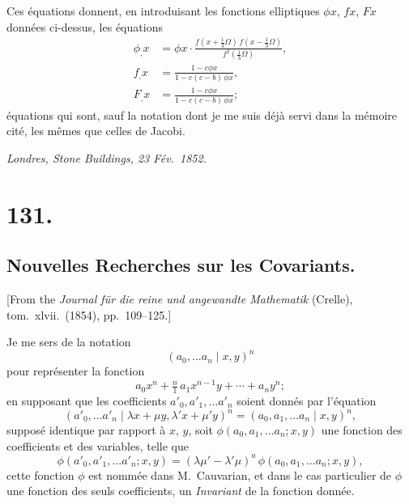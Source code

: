 \documentclass[11pt,a4paper]{article}
\begin{document}
Ces \'equations donnent, en introduisant les fonctions elliptiques $\phi x$, $fx$, $Fx$ donn\'ees ci-dessus, les \'equations
\begin{align*}
\phi_{,} x &= \phi x\cdot\frac{f(x + \tfrac{1}{3}\Omega)\,f(x - \tfrac{1}{3}\Omega)}{f^2(\tfrac{1}{3}\Omega)},\\
f_{,} x &= \frac{1 - c\phi x}{1 - c(c - b)\,\phi x},\\
F_{,} x &= \frac{1 - c\phi x}{1 - c(c - b)\,\phi x};
\end{align*}
\'equations qui sont, sauf la notation dont je me suis d\'ej\`a servi dans la m\'emoire cit\'e, les m\^emes que celles de Jacobi.

\medskip
\noindent\textit{Londres, Stone Buildings, 23 F\'ev.\ 1852.}


\section*{131.}
\subsection*{Nouvelles Recherches sur les Covariants.}


[From the \textit{Journal f\"ur die reine und angewandte Mathematik} (Crelle), tom.\ xlvii.\ (1854), pp.\ 109--125.]

\medskip

Je me sers de la notation
\[
(a_0, \ldots a_n \mid x, y)^n
\]
pour repr\'esenter la fonction
\[
a_0 x^n + \tfrac{n}{1}\, a_1 x^{n-1} y + \cdots + a_n y^n;
\]
en supposant que les coefficients $a'_0, a'_1, \ldots a'_n$ soient donn\'es par l'\'equation
\[
(a'_0, \ldots a'_n \mid \lambda x + \mu y, \lambda' x + \mu' y)^n = (a_0, a_1, \ldots a_n \mid x, y)^n,
\]
suppos\'e identique par rapport \`a $x$, $y$, soit $\phi(a_0, a_1, \ldots a_n; x, y)$ une fonction des coefficients et des variables, telle que
\[
\phi(a'_0, a'_1, \ldots a'_n; x, y) = (\lambda\mu' - \lambda'\mu)^a\,\phi(a_0, a_1, \ldots a_n; x, y),
\]
cette fonction $\phi$ est nomm\'ee dans M.\ Cauvarian, et dans le cas particulier de $\phi$ une fonction des seuls coefficients, un \emph{Invariant} de la fonction donn\'ee.

\medskip
\end{document}

